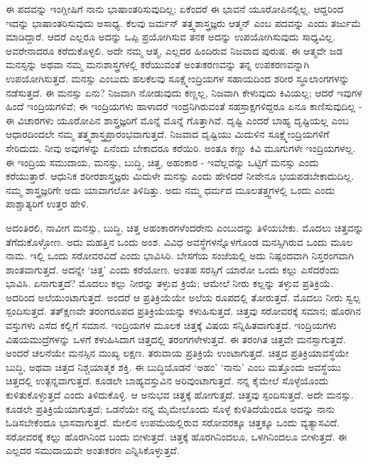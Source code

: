 ಈ ಪದವನ್ನು ಇಂಗ್ಲೀಷಿಗೆ ನಾನು ಭಾಷಾಂತರಿಸುವುದಿಲ್ಲ; ಏಕೆಂದರೆ ಈ ಭಾವನೆ ಯೂರೋಪಿನಲ್ಲಿಲ್ಲ. ಆದ್ದರಿಂದ ಇದನ್ನು ಭಾಷಾಂತರಿಸುವುದು ಅಸಾಧ್ಯ. ಕೆಲವು ಜರ್ಮನ್​ ತತ್ತ್ವಶಾಸ್ತ್ರಜ್ಞರು ಆತ್ಮನ್​ ಎಂಬ ಪದವನ್ನು  ಎಂದು ತರ್ಜುಮೆ ಮಾಡಿದ್ದಾರೆ. ಆದರೆ ಎಲ್ಲರೂ ಅದನ್ನು ಒಪ್ಪಿ ಪ್ರಯೋಗಿಸುವ ತನಕ ಅದನ್ನು ಉಪಯೋಗಿಸುವುದು ಸಾಧ್ಯವಿಲ್ಲ. ಅವರೇನಾದರೂ ಕರೆದುಕೊಳ್ಳಲಿ. ಅದೇ ನಮ್ಮ ಆತ್ಮ, ಎಲ್ಲದರ ಹಿಂದಿರುವ ನಿಜವಾದ ಪುರುಷ. ಈ ಆತ್ಮವೇ ಜಡ ಮನಸ್ಸನ್ನು ಅಥವಾ ನಮ್ಮ ಮನಃಶಾಸ್ತ್ರಗಳಲ್ಲಿ ಕರೆಯುವಂತೆ ಅಂತಃಕರಣವನ್ನು ತನ್ನ ಉಪಕರಣವನ್ನಾಗಿ ಉಪಯೋಗಿಸುತ್ತದೆ. ಮನಸ್ಸು ಎಂಬುದು ಹಲಕೆಲವು ಸೂಕ್ಷ್ಮೇಂದ್ರಿಯಗಳ ಸಹಾಯದಿಂದ ಶರೀರ ಸ್ಥೂಲಾಂಗಗಳನ್ನು ನಡೆಸುತ್ತದೆ. ಈ ಮನಸ್ಸು ಏನು? ನಿಜವಾಗಿ ನೋಡುವುದು ಕಣ್ಣಲ್ಲ, ನಿಜವಾಗಿ ಕೇಳುವುದು ಕಿವಿಯಲ್ಲ; ಆದರೆ ಇವುಗಳ ಹಿಂದೆ ಇಂದ್ರಿಯಗಳಿವೆ; ಈ ಇಂದ್ರಿಯಗಳು ಹಾಳಾದರೆ ಇಂದ್ರನಿಗಿರುವಂತೆ ಸಹಸ್ರಾಕ್ಷಗಳಿದ್ದರೂ ಏನೂ ಕಾಣಿಸುವುದಿಲ್ಲ - ಈ ವಿಚಾರಗಳು ಯೂರೋಪಿನ ಶಾಸ್ತ್ರಜ್ಞರಿಗೆ ಮೊನ್ನೆ ಮೊನ್ನೆ ಗೊತ್ತಾಗಿವೆ. ದೃಷ್ಟಿ ಎಂದರೆ ಬಾಹ್ಯ ದೃಷ್ಟಿಯಲ್ಲ ಎಂಬ ಆಧಾರದಿಂದಲೇ ನಮ್ಮ ತತ್ತ್ವಶಾಸ್ತ್ರಪ್ರಾರಂಭವಾಗುತ್ತದೆ. ನಿಜವಾದ ದೃಷ್ಟಿಯು ಮಿದುಳಿನ ಸೂಕ್ಷ್ಮೇಂದ್ರಿಯಗಳಿಗೆ ಸೇರಿದುದು. ನೀವು ಅವುಗಳನ್ನು ಏನೆಂದು ಬೇಕಾದರೂ ಕರೆಯಿರಿ. ಅಂತೂ ಕಣ್ಣು ಕಿವಿ ಮೂಗುಗಳೇ ಇಂದ್ರಿಯಗಳಲ್ಲ. ಈ ಇಂದ್ರಿಯ ಸಮುದಾಯ, ಮನಸ್ಸು, ಬುದ್ಧಿ, ಚಿತ್ತ, ಅಹಂಕಾರ - ಇವೆಲ್ಲವನ್ನು ಒಟ್ಟಿಗೆ ಮನಸ್ಸು  ಎಂದು ಕರೆಯುತ್ತಾರೆ. ಆಧುನಿಕ ಶರೀರಶಾಸ್ತ್ರಜ್ಞರು ಮಿದುಳೇ ಮನಸ್ಸು ಎಂದು ಹೇಳಿದರೆ ನೀವೇನೂ ಭಯಪಡಬೇಕಾದುದಿಲ್ಲ. ನಮ್ಮ ಶಾಸ್ತ್ರಜ್ಞರಿಗೇ ಅದು ಯಾವಾಗಲೋ ತಿಳಿದಿತ್ತು. ಅದು ನಮ್ಮ ಧರ್ಮದ ಮೂಲತತ್ತ್ವಗಳಲ್ಲಿ ಒಂದು ಎಂದು ಪಾಶ್ಚಾತ್ಯರಿಗೆ ಉತ್ತರ ಹೇಳಿ.

ಅದಂತಿರಲಿ, ನಾವೀಗ ಮನಸ್ಸು, ಬುದ್ಧಿ, ಚಿತ್ತ ಅಹಂಕಾರಗಳೆಂದರೇನು ಎಂಬುದನ್ನು ತಿಳಿಯಬೇಕು. ಮೊದಲು ಚಿತ್ತವನ್ನು ತೆಗೆದುಕೊಳ್ಳೋಣ. ಅದು ಮಹತ್ತಿನ ಒಂದು ಅಂಶ. ವಿವಿಧ ಅವಸ್ಥೆಗಳನ್ನೊಳಗೊಂಡ ಮನಸ್ಸಿಗಿರುವ ಒಂದು ಮೂಲ ನಾಮ. ಇಲ್ಲಿ ಒಂದು ಸರೋವರವಿದೆ ಎಂದು ಭಾವಿಸಿರಿ. ಬೇಸಗೆಯ ಸಂಜೆಯಲ್ಲಿ ಅದು ನಿಷ್ಪಂದವಾಗಿ ನಿಸ್ತರಂಗವಾಗಿ ಶಾಂತವಾಗುತ್ತದೆ. ಅದನ್ನೇ ‘ಚಿತ್ತ’ ಎಂದು ಕರೆಯೋಣ. ಅಂತಹ ಸರಸ್ಸಿಗೆ ಯಾರೋ ಒಂದು ಕಲ್ಲು ಎಸೆದರೆಂದು ಭಾವಿಸಿ. ಏನಾಗುತ್ತದೆ? ಮೊದಲು ಕಲ್ಲು ನೀರನ್ನು ತಳ್ಳುವ ಕ್ರಿಯೆ; ಆಮೇಲೆ ನೀರು ಕಲ್ಲನ್ನು ತಳ್ಳುವ ಪ್ರತಿಕ್ರಿಯೆ. ಅದರಿಂದ ಅಲೆಯುಂಟಾಗುತ್ತದೆ. ಅಂದರೆ ಆ ಪ್ರತಿಕ್ರಿಯೆಯೇ ಅಲೆಯ ರೂಪದಲ್ಲಿ ತೋರುತ್ತದೆ. ಮೊದಲು ನೀರು ಸ್ವಲ್ಪ ಸ್ಪಂದಿಸುತ್ತದೆ. ತತ್​ಕ್ಷಣವೇ ತರಂಗರೂಪದ ಪ್ರತಿಕ್ರಿಯೆಯನ್ನು ಕಳುಹಿಸುತ್ತದೆ. ಚಿತ್ತವು ಸರೋವರಕ್ಕೆ ಸಮಾನ; ಹೊರಗಿನ ವಸ್ತುಗಳು ಎಸೆದ ಕಲ್ಲಿಗೆ ಸಮಾನ. ಇಂದ್ರಿಯಗಳ ಮೂಲಕ ಚಿತ್ತಕ್ಕೆ ವಿಷಯ ಸನ್ನಿಹಿತವಾಗುತ್ತದೆ. ಇಂದ್ರಿಯಗಳು ವಿಷಯಮುದ್ರೆಗಳನ್ನು ಒಳಗೆ ಕಳುಹಿಸಿದಾಗ ಚಿತ್ತದಲ್ಲಿ ತರಂಗಗಳೇಳುತ್ತವೆ. ಈ ತರಂಗಿತ ಚಿತ್ತವೇ ಮನಸ್ಸಾಗುತ್ತದೆ. ಅಂದರೆ ಚಲನೆಯೇ ಮನಸ್ಸಿನ ಮುಖ್ಯ ಲಕ್ಷಣ. ತರುವಾಯ ಪ್ರತಿಕ್ರಿಯೆ ಉಂಟಾಗುತ್ತದೆ. ಚಿತ್ತದ ಪ್ರತಿಕ್ರಿಯಾವಸ್ಥೆಯೇ ಬುದ್ಧಿ, ಅಥವಾ ಚಿತ್ತದ ನಿಶ್ಚಯಾತ್ಮಕ ಶಕ್ತಿ. ಈ ಬುದ್ಧಿಯೊಡನೆ ‘ಅಹಂ’ ‘ನಾನು’ ಎಂಬ ಮತ್ತೊಂದು ಅವಸ್ಥೆಯು ಚಿತ್ತದಲ್ಲಿ ಉತ್ಪನ್ನವಾಗುತ್ತದೆ. ಕೂಡಲೇ ಬಾಹ್ಯವಸ್ತುವಿನ ಅರಿವುಂಟಾಗುತ್ತದೆ. ನನ್ನ ಕೈಮೇಲೆ ಸೊಳ್ಳೆಯೊಂದು ಕುಳಿತುಕೊಳ್ಳುತ್ತದೆ ಎಂದು ತಿಳಿದುಕೊಳ್ಳಿ. ಆ ಅನುಭವ ಚಿತ್ತಕ್ಕೆ ಹೋಗುತ್ತದೆ. ಚಿತ್ತವು ಸ್ಪಂದಿಸುತ್ತದೆ. ಅದೇ ಮನಸ್ಸು. ಕೂಡಲೇ ಪ್ರತಿಕ್ರಿಯೆಯಾಗುತ್ತದೆ; ಒಡನೆಯೇ ನನ್ನ ಮೈಮೇಲೊಂದು ಸೊಳ್ಳೆ ಕುಳಿತಿದೆಯೆಂದೂ ಅದನ್ನು ನಾನು ಓಡಿಸಬೇಕೆಂದೂ ಭಾಸವಾಗುತ್ತದೆ. ಮೇಲಿನ ಉಪಮೆಯಲ್ಲಿರುವ ಸರೋವರಕ್ಕೂ ಚಿತ್ತಕ್ಕೂ ಒಂದು ವ್ಯತ್ಯಾಸವಿದೆ. ಸರೋವರಕ್ಕೆ ಕಲ್ಲು ಹೊರಗಿನಿಂದ ಬಂದು ಬೀಳುತ್ತದೆ. ಚಿತ್ತಕ್ಕೆ ಹೊರಗಿನಿಂದಲೂ, ಒಳಗಿನಿಂದಲೂ ಬೀಳುತ್ತದೆ. ಈ ಎಲ್ಲದರ ಸಮುದಾಯವೇ ಅಂತಃಕರಣ ಎನ್ನಿಸಿಕೊಳ್ಳುತ್ತದೆ.

